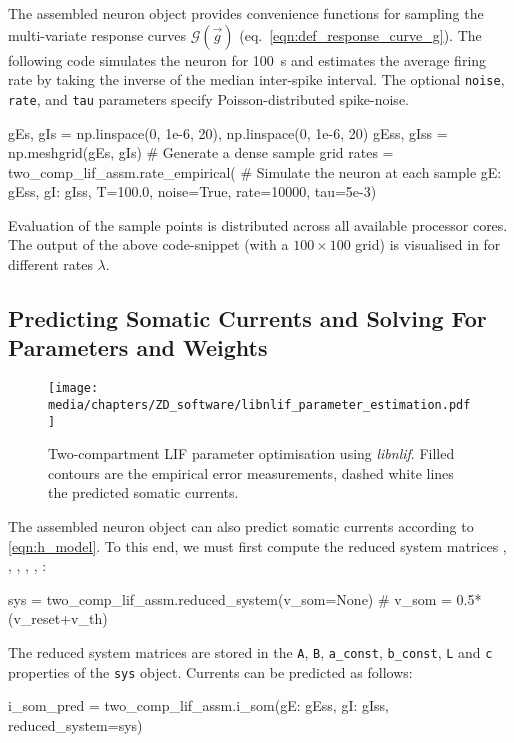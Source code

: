 The assembled neuron object provides convenience functions for sampling the multi-variate response curves $\mathscr{G}(\vec g)$ (eq.~\ref{eqn:def_response_curve_g}).
The following code simulates the neuron for \SI{100}{\second} and estimates the average firing rate by taking the inverse of the median inter-spike interval.
The optional \texttt{noise}, \texttt{rate}, and \texttt{tau} parameters specify Poisson-distributed spike-noise.
\begin{pythoncode}
gEs, gIs = np.linspace(0, 1e-6, 20), np.linspace(0, 1e-6, 20) 
gEss, gIss = np.meshgrid(gEs, gIs)        # Generate a dense sample grid
rates = two_comp_lif_assm.rate_empirical( # Simulate the neuron at each sample
	{gE: gEss, gI: gIss}, T=100.0, noise=True, rate=10000, tau=5e-3)
\end{pythoncode}
Evaluation of the sample points is distributed across all available processor cores.
The output of the above code-snippet (with a $100 \times 100$ grid) is visualised in  for different rates $\lambda$.

\subsection{Predicting Somatic Currents and Solving For Parameters and Weights}

\begin{figure}
	\centering
	\texttt{[image: media/chapters/ZD\_software/libnlif\_parameter\_estimation.pdf]}%
	{\label{fig:libnlif_parameter_estimation_a}}%
	{\label{fig:libnlif_parameter_estimation_b}}%
	{\label{fig:libnlif_parameter_estimation_c}}%
	\caption[Two-compartment LIF parameter optimisation using \emph{libnlif}]{Two-compartment LIF parameter optimisation using \emph{libnlif}.
	Filled contours are the empirical error measurements, dashed white lines the predicted somatic currents.}
	\label{fig:libnlif_parameter_estimation}
\end{figure}

The assembled neuron object can also predict somatic currents according to \cref{eqn:h_model}.
To this end, we must first compute the reduced system matrices \mrAp, \mrBp, \vrap, \vrbp, \mrL, \vrc:
\begin{pythoncode}
sys = two_comp_lif_assm.reduced_system(v_som=None) # v_som = 0.5*(v_reset+v_th)
\end{pythoncode}
The reduced system matrices are stored in the \texttt{A}, \texttt{B}, \texttt{a\_const}, \texttt{b\_const}, \texttt{L} and \texttt{c} properties of the \texttt{sys} object.
Currents can be predicted as follows:
\begin{pythoncode}
i_som_pred = two_comp_lif_assm.i_som({gE: gEss, gI: gIss}, reduced_system=sys)
\end{pythoncode}


